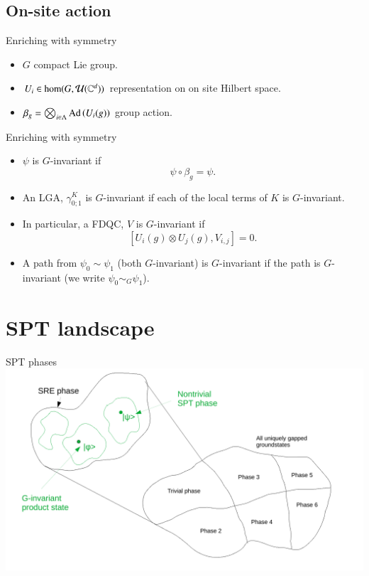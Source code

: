 \documentclass{beamer}
\begin{document}
\subsection{On-site action}

\begin{frame}{Enriching with symmetry}
	\begin{center}
		\scalebox{0.75}{
		
		}
	\end{center}
	\begin{itemize}
		\item $G$ compact Lie group.
		\item $U_i\in\hom(G,\mathcal{U}(\mathbb{C}^d))$ representation on on site Hilbert space.
		\item $\beta_g=\bigotimes_{i\in\Lambda}\textrm{Ad}\left(U_i(g)\right)$ group action.
	\end{itemize}
\end{frame}

\begin{frame}{Enriching with symmetry}
	\begin{itemize}
		\item<1-> $\psi$ is $G$-invariant if
		\[\psi\circ\beta_g=\psi.\]
		\item<2-> An LGA, $\gamma^K_{0;1}$ is $G$-invariant if each of the local terms of $K$ is $G$-invariant.
		\item<3-> In particular, a FDQC, $V$ is $G$-invariant if
		\[[U_{i}(g)\otimes U_j(g),V_{i,j}]=0.\]
		\item<4-> A path from $\psi_0\sim \psi_1$ (both $G$-invariant) is $G$-invariant if the path is $G$-invariant (we write $\psi_0\sim_G\psi_1$).
	\end{itemize}
\end{frame}

\section{SPT landscape}

\begin{frame}{SPT phases}
	\includegraphics[width=\textwidth]{Figures/SPT_Phases.pdf}
\end{frame}
\end{document}
